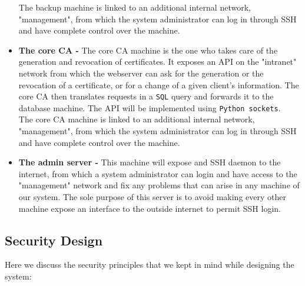 \documentclass[english]{article}
\begin{document}
\begin{itemize}
		The backup machine is linked to an additional internal network, "management", from which the system administrator can log in through SSH and have complete control over the machine.
	\item \textbf{The core CA - } The core CA machine is the one who takes care of the generation and revocation of certificates. It exposes an API  on the "intranet" network from which the webserver can ask for the generation or the revocation of a certificate, or for a change of a given client's information. The core CA then translates requests in a \texttt{SQL} query and forwards it to the database machine. The API will be implemented using \texttt{Python sockets}. \\
		The core CA machine is linked to an additional internal network, "management", from which the system administrator can log in through SSH and have complete control over the machine.
	\item \textbf{The admin server -} This machine will expose and SSH daemon to the internet, from which a system administrator can login and have access to the "management" network and fix any problems that can arise in any machine of our system. The sole purpose of this server is to avoid making every other machine expose an interface to the outside internet to permit SSH login.
\end{itemize}


\subsection{Security Design}

Here we discuss the security principles that we kept in mind while designing the system:
\end{document}
